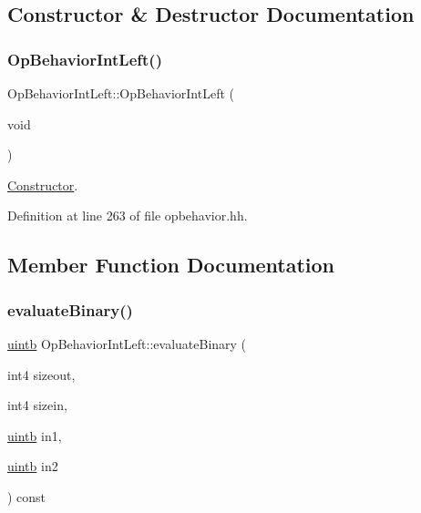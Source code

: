 \subsection{Constructor \& Destructor Documentation}
\mbox{\label{class_op_behavior_int_left_ac7fa7af06225f7de57c6bc9d50de9585}} 
\subsubsection{\texorpdfstring{OpBehaviorIntLeft()}{OpBehaviorIntLeft()}}
{\footnotesize\ttfamily Op\+Behavior\+Int\+Left\+::\+Op\+Behavior\+Int\+Left (\begin{DoxyParamCaption}\item[{void}]{ }\end{DoxyParamCaption})\hspace{0.3cm}{\ttfamily [inline]}}



\mbox{\hyperlink{class_constructor}{Constructor}}. 



Definition at line 263 of file opbehavior.\+hh.



\subsection{Member Function Documentation}
\mbox{\label{class_op_behavior_int_left_a573c2bd10543d50ea622b0d3beb2d5c4}} 
\subsubsection{\texorpdfstring{evaluateBinary()}{evaluateBinary()}}
{\footnotesize\ttfamily \mbox{\hyperlink{types_8h_a2db313c5d32a12b01d26ac9b3bca178f}{uintb}} Op\+Behavior\+Int\+Left\+::evaluate\+Binary (\begin{DoxyParamCaption}\item[{int4}]{sizeout,  }\item[{int4}]{sizein,  }\item[{\mbox{\hyperlink{types_8h_a2db313c5d32a12b01d26ac9b3bca178f}{uintb}}}]{in1,  }\item[{\mbox{\hyperlink{types_8h_a2db313c5d32a12b01d26ac9b3bca178f}{uintb}}}]{in2 }\end{DoxyParamCaption}) const\hspace{0.3cm}{\ttfamily [virtual]}}



